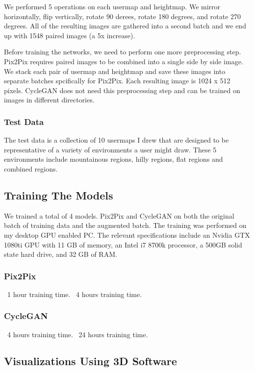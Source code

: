 \documentclass[twocolumn]{article}
\begin{document}
	We performed 5 operations on each usermap and heightmap. We mirror horizontally, flip vertically, rotate 90 derees, rotate 180 degrees, and rotate 270 degrees.	All of the resulting images are gathered into a second batch and we end up with 1548 paired images (a 5x increase).
	
	Before training the networks, we need to perform one more preprocessing step. Pix2Pix requires paired images to be combined into a single side by side image. We stack each pair of usermap and heightmap and save these images into separate batches spcifically for Pix2Pix. Each resulting image is 1024 x 512 pixels. CycleGAN does not need this preprocessing step and can be trained on images in different directories.
			
	\subsubsection{Test Data}
	
	The test data is a collection of 10 usermaps I drew that are designed to be representative of a variety of environments a user might draw. These 5 environments include mountainous regions, hilly regions, flat regions and combined regions.
	
	\subsection{Training The Models}
	
	We trained a total of 4 models. Pix2Pix and CycleGAN on both the original batch of training data and the augmented batch. The training was performed on my desktop GPU enabled PC. The relevant specifications include an Nvidia GTX 1080ti GPU with 11 GB of memory, an Intel i7 8700k processor, a 500GB solid state hard drive, and 32 GB of RAM.
	
	\subsubsection{Pix2Pix}
	~1 hour training time.
	~4 hours training time.
	
	\subsubsection{CycleGAN}
	~4 hours training time.
	~24 hours training time.

	\subsection{Visualizations Using 3D Software}
	
\end{document}
